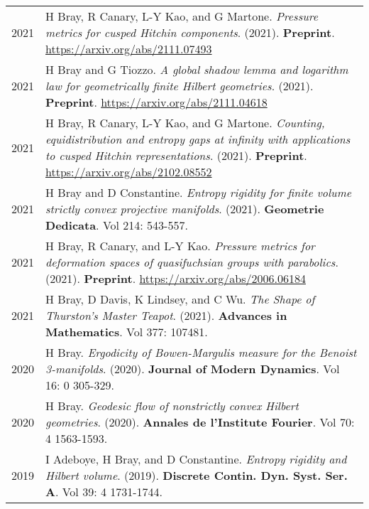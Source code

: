
    \medskip


    \medskip
    
    \begin{center}
    {
    \renewcommand{\arraystretch}{1.5}
    \begin{longtable}{p{}  p{}}
    
2021 & 
        H Bray, R Canary, L-Y Kao, and G Martone. \textit{Pressure metrics for cusped Hitchin components}. (2021). 
         \textbf{Preprint}. \url{https://arxiv.org/abs/2111.07493}\\ 

2021 & 
        H Bray and G Tiozzo. \textit{A global shadow lemma and logarithm law for geometrically finite Hilbert geometries}. (2021). 
         \textbf{Preprint}. \url{https://arxiv.org/abs/2111.04618}\\ 

2021 & 
        H Bray, R Canary, L-Y Kao, and G Martone. \textit{Counting, equidistribution and entropy gaps at infinity with applications to cusped Hitchin representations}. (2021). 
         \textbf{Preprint}. \url{https://arxiv.org/abs/2102.08552}\\ 

2021 & 
        H Bray and D Constantine. \textit{Entropy rigidity for finite volume strictly convex projective manifolds}. (2021). 
        \textbf{Geometrie Dedicata}. Vol 214:  543-557.\\ 

2021 & 
        H Bray, R Canary, and L-Y Kao. \textit{Pressure metrics for deformation spaces of quasifuchsian groups with parabolics}. (2021). 
         \textbf{Preprint}. \url{https://arxiv.org/abs/2006.06184}\\ 

2021 & 
        H Bray, D Davis, K Lindsey, and C Wu. \textit{The Shape of Thurston's Master Teapot}. (2021). 
        \textbf{Advances in Mathematics}. Vol 377: 107481.\\ 

2020 & 
        H Bray. \textit{Ergodicity of Bowen-Margulis measure for the Benoist 3-manifolds}. (2020). 
        \textbf{Journal of Modern Dynamics}. Vol 16: 0 305-329.\\ 

2020 & 
        H Bray. \textit{Geodesic flow of nonstrictly convex Hilbert geometries}. (2020). 
        \textbf{Annales de l'Institute Fourier}. Vol 70: 4 1563-1593.\\ 

2019 & 
        I Adeboye, H Bray, and D Constantine. \textit{Entropy rigidity and Hilbert volume}. (2019). 
        \textbf{Discrete Contin. Dyn. Syst. Ser. A}. Vol 39: 4 1731-1744.
    \end{longtable}
    } 
    \end{center}

    \vspace{-1em}
    